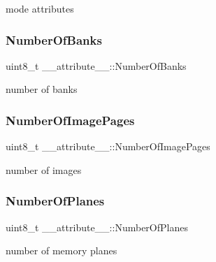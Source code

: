 mode attributes 

\hypertarget{struct____attribute_____a59483378dd87414afcde6cb3ca93c2d8}{}\label{struct____attribute_____a59483378dd87414afcde6cb3ca93c2d8} 
\subsubsection{\texorpdfstring{Number\+Of\+Banks}{NumberOfBanks}}
{\footnotesize\ttfamily uint8\+\_\+t \+\_\+\+\_\+attribute\+\_\+\+\_\+\+::\+Number\+Of\+Banks}



number of banks 

\hypertarget{struct____attribute_____a988714bc16626547fbdc31f25dfa6470}{}\label{struct____attribute_____a988714bc16626547fbdc31f25dfa6470} 
\subsubsection{\texorpdfstring{Number\+Of\+Image\+Pages}{NumberOfImagePages}}
{\footnotesize\ttfamily uint8\+\_\+t \+\_\+\+\_\+attribute\+\_\+\+\_\+\+::\+Number\+Of\+Image\+Pages}



number of images 

\hypertarget{struct____attribute_____ab1471d2f75e61117d65290da9070cf89}{}\label{struct____attribute_____ab1471d2f75e61117d65290da9070cf89} 
\subsubsection{\texorpdfstring{Number\+Of\+Planes}{NumberOfPlanes}}
{\footnotesize\ttfamily uint8\+\_\+t \+\_\+\+\_\+attribute\+\_\+\+\_\+\+::\+Number\+Of\+Planes}



number of memory planes 

